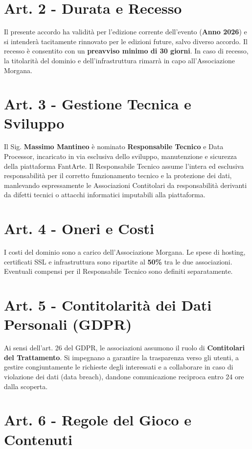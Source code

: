 \documentclass[a4paper,11pt]{article}
\begin{document}
\section*{Art. 2 - Durata e Recesso}

Il presente accordo ha validità per l'edizione corrente dell'evento (\textbf{Anno 2026}) e si intenderà tacitamente rinnovato per le edizioni future, salvo diverso accordo. Il recesso è consentito con un \textbf{preavviso minimo di 30 giorni}. In caso di recesso, la titolarità del dominio e dell'infrastruttura rimarrà in capo all'Associazione Morgana.

\section*{Art. 3 - Gestione Tecnica e Sviluppo}

Il Sig. \textbf{Massimo Mantineo} è nominato \textbf{Responsabile Tecnico} e Data Processor, incaricato in via esclusiva dello sviluppo, manutenzione e sicurezza della piattaforma FantArte. Il Responsabile Tecnico assume l'intera ed esclusiva responsabilità per il corretto funzionamento tecnico e la protezione dei dati, manlevando espressamente le Associazioni Contitolari da responsabilità derivanti da difetti tecnici o attacchi informatici imputabili alla piattaforma.

\section*{Art. 4 - Oneri e Costi}

I costi del dominio sono a carico dell'Associazione Morgana. Le spese di hosting, certificati SSL e infrastruttura sono ripartite al \textbf{50\%} tra le due associazioni. Eventuali compensi per il Responsabile Tecnico sono definiti separatamente.

\section*{Art. 5 - Contitolarità dei Dati Personali (GDPR)}

Ai sensi dell'art. 26 del GDPR, le associazioni assumono il ruolo di \textbf{Contitolari del Trattamento}. Si impegnano a garantire la trasparenza verso gli utenti, a gestire congiuntamente le richieste degli interessati e a collaborare in caso di violazione dei dati (data breach), dandone comunicazione reciproca entro 24 ore dalla scoperta.

\section*{Art. 6 - Regole del Gioco e Contenuti}
\end{document}
